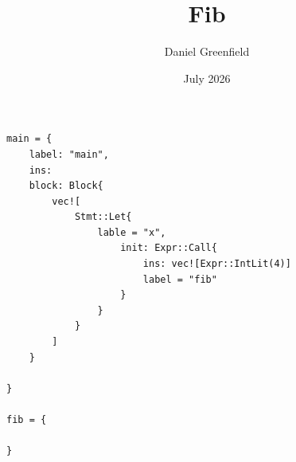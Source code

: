\documentclass{article}
\title{Fib}
\author{Daniel Greenfield}
\date{July 2026}
\begin{document}
\maketitle

\begin{verbatim}
main = {
    label: "main",
    ins: 
    block: Block{
        vec![
            Stmt::Let{
                lable = "x",
                    init: Expr::Call{
                        ins: vec![Expr::IntLit(4)]
                        label = "fib"
                    }
                }
            }
        ]        
    }

}

fib = {

}
\end{verbatim}
\end{document}
